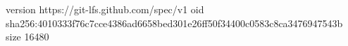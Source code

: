 version https://git-lfs.github.com/spec/v1
oid sha256:4010333f76c7cce4386ad6658bed301e26ff50f34400c0583c8ca3476947543b
size 16480
